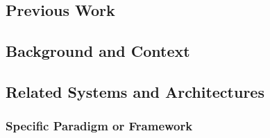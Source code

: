 \documentclass[11pt]{article}
\newif\ifguidance
\newcommand{\guidance}[1]{\ifguidance\textcolor{blue}{\small\textit{[#1]}}\fi}
\begin{document}
\begin{multicols}{2}
\section{Previous Work}
\label{sec:previous_work}

\guidance{%
  MARKING: This is the highest-weighted section at 40 marks. The marker
  will assess: (1) clarity and readability of writing, (2) whether
  references are appropriate, thorough and properly cited, (3) clear
  logical organisation, (4) [MSc only] critical analysis of the field
  --- do not just summarise papers but compare, contrast, and identify
  gaps, and (5) [MSc only] commentary on how the reviewed technologies
  apply to emerging application areas. Aim for a well-structured
  narrative, not a list of paper summaries.}

\subsection{Background and Context}
\label{sec:background}

\guidance{%
  Set the scene. Explain foundational concepts the reader needs to
  understand the rest of the review (e.g.\ how humans process language,
  key terminology, the domain your system operates in).}


\subsection{Related Systems and Architectures}
\label{sec:related_systems}

\guidance{%
  Survey the main category of systems your work relates to. Describe the
  evolution from earlier approaches to current ones. Cite key papers and
  explain how each contributes to the field.}


\subsubsection{Specific Paradigm or Framework}


\end{multicols}
\end{document}
